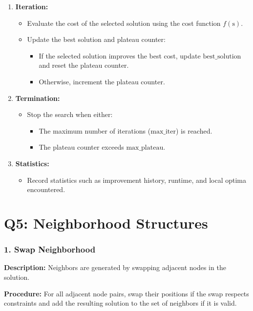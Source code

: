 \documentclass{article}
\begin{document}
\begin{enumerate}
    \item \textbf{Iteration:}
    \begin{itemize}
        \item Evaluate the cost of the selected solution using the cost function \( f(\text{s}) \).
        \item Update the best solution and plateau counter:
        \begin{itemize}
            \item If the selected solution improves the best cost, update \( \text{best\_solution} \) and reset the plateau counter.
            \item Otherwise, increment the plateau counter.
        \end{itemize}
    \end{itemize}
    
    \item \textbf{Termination:}
    \begin{itemize}
        \item Stop the search when either:
        \begin{itemize}
            \item The maximum number of iterations (\( \text{max\_iter} \)) is reached.
            \item The plateau counter exceeds \( \text{max\_plateau} \).
        \end{itemize}
    \end{itemize}
    
    \item \textbf{Statistics:}
    \begin{itemize}
        \item Record statistics such as improvement history, runtime, and local optima encountered.
    \end{itemize}
\end{enumerate}


\section*{Q5: Neighborhood Structures}
\subsubsection*{1. Swap Neighborhood}
\textbf{Description:} Neighbors are generated by swapping adjacent nodes in the solution.

\noindent \textbf{Procedure:}  For all adjacent node pairs, swap their positions if the swap respects constraints and add the resulting solution to the set of neighbors if it is valid.
\end{document}
